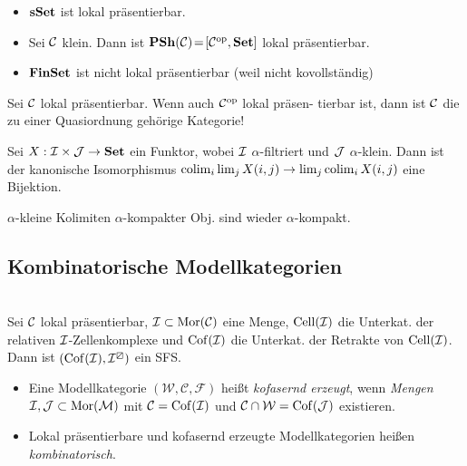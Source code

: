 \documentclass{cheat-sheet}
\newcommand{\lhhe}{\boxslash} %
\newcommand{\Weak}{\mathcal{W}} %
\newcommand{\Cof}{\mathcal{C}} %
\newcommand{\Fib}{\mathcal{F}} %
\newcommand{\ModC}{\mathcal{M}} %
\DeclareMathOperator{\Cell}{Cell} %
\DeclareMathOperator{\Coff}{Cof} %
\newcommand{\ModStr}{$(\Weak, \Cof, \Fib)$} %
\begin{document}
\begin{bspe}
  \begin{itemize}
    \item $\mathbf{sSet}$ ist lokal präsentierbar.
    \item Sei $\mathcal{C}$ klein. Dann ist $\mathbf{PSh}(\mathcal{C}) \!=\! [\mathcal{C}^{\mathrm{op}}, \mathbf{Set}]$ lokal präsentierbar.
    \item $\mathbf{FinSet}$ ist nicht lokal präsentierbar (weil nicht kovollständig)
  \end{itemize}
\end{bspe}

\begin{fun}
  Sei $\mathcal{C}$ lokal präsentierbar. Wenn auch $\mathcal{C}^{\mathrm{op}}$ lokal präsen- tierbar ist, dann ist $\mathcal{C}$ die zu einer Quasiordnung gehörige Kategorie!
\end{fun}

\begin{lem}
  Sei $X : \mathcal{I} \times \mathcal{J} \to \mathbf{Set}$ ein Funktor, wobei $\mathcal{I}$ $\alpha$-filtriert und $\mathcal{J}$ $\alpha$-klein.
  Dann ist der kanonische Isomorphismus $\operatorname{colim}_i \lim_j X(i, j) \to \lim_j \operatorname{colim}_i X(i, j)$ eine Bijektion.
\end{lem}

\begin{bsp}
  $\alpha$-kleine Kolimiten $\alpha$-kompakter Obj. sind wieder $\alpha$-kompakt.
\end{bsp}

\subsection{Kombinatorische Modellkategorien}

\begin{lem}\mbox{}\\
  Sei $\mathcal{C}$ lokal präsentierbar, $\mathcal{I} \subset \operatorname{Mor}(\mathcal{C})$ eine Menge, $\Cell(\Iat)$ die Unterkat. der relativen $\mathcal{I}$-Zellenkomplexe und $\Coff(\Iat)$ die Unterkat. der Retrakte von $\Cell(\Iat)$.
  Dann ist $(\Coff(\Iat), \Iat^\lhhe)$ ein SFS.
\end{lem}

\begin{defn}
  \begin{itemize}
    \item Eine Modellkategorie \ModStr{} heißt \emph{kofasernd erzeugt}, wenn {\em Mengen} $\Iat, \Jat \subset \Mor(\ModC)$ mit $\Cof = \Coff(\Iat)$ und $\Cof \cap \Weak = \Coff(\Jat)$ existieren.
    \item Lokal präsentierbare und kofasernd erzeugte Modellkategorien heißen \emph{kombinatorisch}.
  \end{itemize}
\end{defn}
\end{document}
